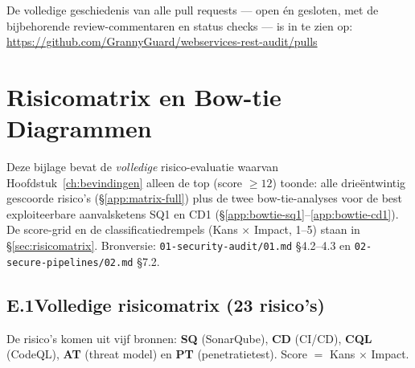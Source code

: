 \documentclass[12pt, a4paper]{report}
\begin{document}
De volledige geschiedenis van alle pull requests --- open én gesloten, met de
bijbehorende review-commentaren en status checks --- is in te zien op:
\url{https://github.com/GrannyGuard/webservices-rest-audit/pulls}

\chapter{Risicomatrix en Bow-tie Diagrammen}
\label{app:risicomatrix}

Deze bijlage bevat de \emph{volledige} risico-evaluatie waarvan Hoofdstuk~\ref{ch:bevindingen}
alleen de top (score $\geq 12$) toonde: alle drieëntwintig gescoorde risico's
(\S\ref{app:matrix-full}) plus de twee bow-tie-analyses voor de best exploiteerbare
aanvalsketens SQ1 en CD1 (\S\ref{app:bowtie-sq1}--\ref{app:bowtie-cd1}). De
score-grid en de classificatiedrempels (Kans $\times$ Impact, 1--5) staan in
\S\ref{sec:risicomatrix}. Bronversie: \texttt{01-security-audit/01.md} \S4.2--4.3
en \texttt{02-secure-pipelines/02.md} \S7.2.

\section*{E.1\quad Volledige risicomatrix (23 risico's)}
\label{app:matrix-full}

De risico's komen uit vijf bronnen: \textbf{SQ} (SonarQube), \textbf{CD} (CI/CD),
\textbf{CQL} (CodeQL), \textbf{AT} (threat model) en \textbf{PT} (penetratietest).
Score $=$ Kans $\times$ Impact.
\end{document}
